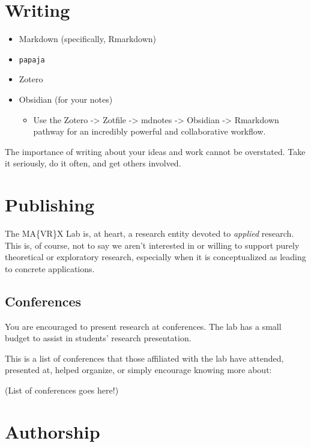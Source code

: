 \documentclass[
]{book}
\providecommand{\tightlist}{%
  \setlength{\itemsep}{0pt}\setlength{\parskip}{0pt}}
\begin{document}
\hypertarget{writing}{%
\section{Writing}\label{writing}}

\begin{itemize}
\tightlist
\item
  Markdown (specifically, Rmarkdown)
\item
  \texttt{papaja}
\item
  Zotero
\item
  Obsidian (for your notes)

  \begin{itemize}
  \tightlist
  \item
    Use the Zotero -\textgreater{} Zotfile -\textgreater{} mdnotes -\textgreater{} Obsidian -\textgreater{} Rmarkdown pathway for an incredibly powerful and collaborative workflow.
  \end{itemize}
\end{itemize}

The importance of writing about your ideas and work cannot be overstated. Take it seriously, do it often, and get others involved.

\hypertarget{publishing}{%
\section{Publishing}\label{publishing}}

The MA\{VR\}X Lab is, at heart, a research entity devoted to \emph{applied} research. This is, of course, not to say we aren't interested in or willing to support purely theoretical or exploratory research, especially when it is conceptualized as leading to concrete applications.

\hypertarget{conferences}{%
\subsection{Conferences}\label{conferences}}

You are encouraged to present research at conferences. The lab has a small budget to assist in students' research presentation.

This is a list of conferences that those affiliated with the lab have attended, presented at, helped organize, or simply encourage knowing more about:

(List of conferences goes here!)

\hypertarget{authorship}{%
\section{Authorship}\label{authorship}}
\end{document}
